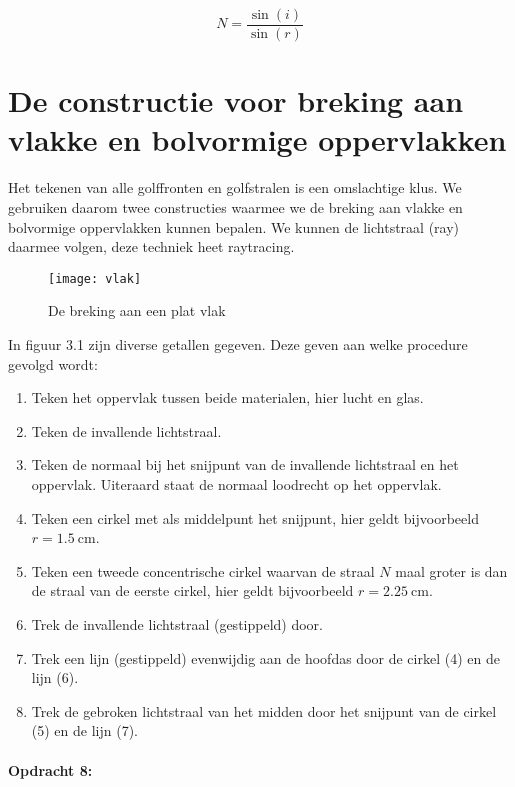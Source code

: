 \[
N=\frac{\sin(i)}{\sin(r)}
\]


\section{De constructie voor breking aan vlakke en bolvormige oppervlakken}

Het tekenen van alle golffronten en golfstralen is een omslachtige
klus. We gebruiken daarom twee constructies waarmee we de breking
aan vlakke en bolvormige oppervlakken kunnen bepalen. We kunnen de
lichtstraal (ray) daarmee volgen, deze techniek heet raytracing.

\begin{figure}[H]
\noindent \begin{centering}
\texttt{[image: vlak]}
\par\end{centering}

\caption{De breking aan een plat vlak}
\end{figure}


In figuur 3.1 zijn diverse getallen gegeven. Deze geven aan welke
procedure gevolgd wordt:
\begin{enumerate}
\item Teken het oppervlak tussen beide materialen, hier lucht en glas.
\item Teken de invallende lichtstraal.
\item Teken de normaal bij het snijpunt van de invallende lichtstraal en
het oppervlak. Uiteraard staat de normaal loodrecht op het oppervlak.
\item Teken een cirkel met als middelpunt het snijpunt, hier geldt bijvoorbeeld
$r=\SI{1.5}{\centi\meter}$.
\item Teken een tweede concentrische cirkel waarvan de straal $N$ maal
groter is dan de straal van de eerste cirkel, hier geldt bijvoorbeeld
$r=\SI{2.25}{\centi\meter}$. 
\item Trek de invallende lichtstraal (gestippeld) door. 
\item Trek een lijn (gestippeld) evenwijdig aan de hoofdas door de cirkel
(4) en de lijn (6).
\item Trek de gebroken lichtstraal van het midden door het snijpunt van
de cirkel (5) en de lijn (7).
\end{enumerate}

\paragraph*{Opdracht 8:}

